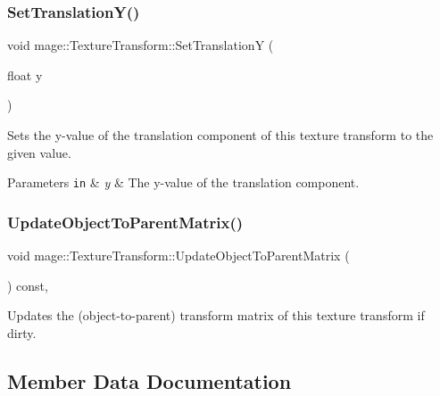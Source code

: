 \subsubsection{\texorpdfstring{Set\+Translation\+Y()}{SetTranslationY()}}
{\footnotesize\ttfamily void mage\+::\+Texture\+Transform\+::\+Set\+TranslationY (\begin{DoxyParamCaption}\item[{float}]{y }\end{DoxyParamCaption})\hspace{0.3cm}{\ttfamily [noexcept]}}

Sets the y-\/value of the translation component of this texture transform to the given value.


\begin{DoxyParams}[1]{Parameters}
\mbox{\tt in}  & {\em y} & The y-\/value of the translation component. \\
\hline
\end{DoxyParams}
\hypertarget{structmage_1_1_texture_transform_a9c57bc18eead3ce17265ae9cd3a7a8c7}{}\label{structmage_1_1_texture_transform_a9c57bc18eead3ce17265ae9cd3a7a8c7} 
\subsubsection{\texorpdfstring{Update\+Object\+To\+Parent\+Matrix()}{UpdateObjectToParentMatrix()}}
{\footnotesize\ttfamily void mage\+::\+Texture\+Transform\+::\+Update\+Object\+To\+Parent\+Matrix (\begin{DoxyParamCaption}{ }\end{DoxyParamCaption}) const\hspace{0.3cm}{\ttfamily [private]}, {\ttfamily [noexcept]}}

Updates the (object-\/to-\/parent) transform matrix of this texture transform if dirty. 

\subsection{Member Data Documentation}
\hypertarget{structmage_1_1_texture_transform_a7d23cd89e4ab16e08a214272d280c5e2}{}\label{structmage_1_1_texture_transform_a7d23cd89e4ab16e08a214272d280c5e2} 

